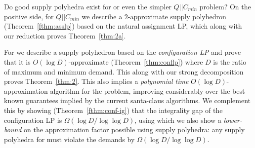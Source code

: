\medskip {}
Do good supply polyhedra exist for \cckp or even the simpler $Q||C_{min} $ problem?
On the positive side, for $Q||C_{min}$ we describe a $2$-approximate supply polyhedron (Theorem~\ref{fthm:asslp}) based on the natural assignment LP, which along with our reduction proves Theorem~\ref{thm:2a}. %

For \cckp we describe a supply polyhedron based on the {\em configuration LP} and prove that it is $O(\log D)$-approximate (Theorem~\ref{thm:conflp}) where $D$ is the ratio of maximum and minimum demand. This along with our strong decomposition proves Theorem~\ref{thm:2}. This also implies a {\em polynomial time} $O(\log D)$-approximation algorithm for the \cckp problem, improving considerably over the best known guarantees implied by the current santa-claus algorithms. %
We complement this by showing (Theorem~\ref{fthm:conf-ig}) that the integrality gap of the configuration LP is $\Omega(\log D/\log\log D)$, using which we also show a \emph{lower-bound} on the approximation factor possible using supply polyhedra: any supply polyhedra for \cckp must violate the demands by $\Omega(\log D/\log \log D)$.







